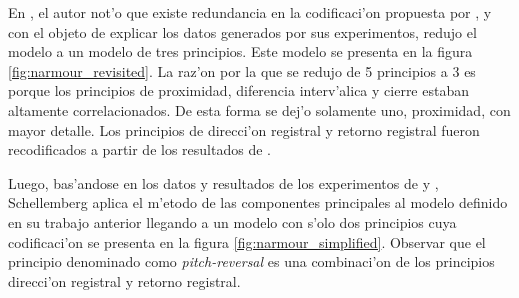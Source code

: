 En \cite{Schellenberg96}, el autor not'o que existe redundancia en la codificaci'on propuesta por \cite{Narmour91}, y con el objeto de explicar los datos
generados por sus experimentos, redujo el modelo a un modelo de tres principios. Este modelo se presenta en la figura \ref{fig:narmour_revisited}.
La raz'on por la que se redujo de 5 principios a 3 es porque los principios de proximidad, diferencia interv'alica y cierre estaban altamente 
correlacionados. De esta forma se dej'o solamente uno, proximidad, con mayor detalle. Los principios de direcci'on registral y retorno registral
fueron recodificados a partir de los resultados de \cite{CuddyLunney95}.

\begin{imagen}
    \width{9cm}
\end{imagen}



Luego, bas'andose en los datos y resultados de los experimentos de \cite{Schellenberg96} y \citet{CuddyLunney95}, Schellemberg aplica el m'etodo de 
las componentes principales al modelo definido en su trabajo anterior llegando a un modelo con s'olo dos principios cuya codificaci'on
se presenta en la figura \ref{fig:narmour_simplified}. 
Observar que el principio denominado como \emph{pitch-reversal} es una combinaci'on de los principios direcci'on registral y retorno registral. 

\begin{imagen}
    \width{10cm}
\end{imagen}

